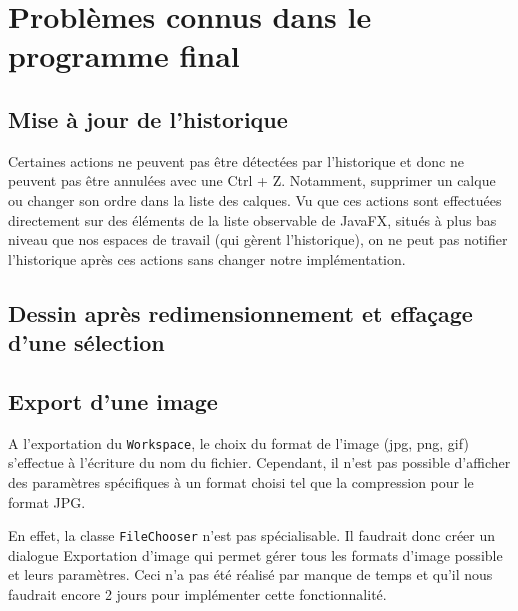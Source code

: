 \section{Problèmes connus dans le programme final}
\subsection{Mise à jour de l'historique}
Certaines actions ne peuvent pas être détectées par l'historique et donc ne peuvent pas être annulées avec une Ctrl + Z. Notamment, supprimer un calque ou changer son ordre dans la liste des calques. Vu que ces actions sont effectuées directement sur des éléments de la liste observable de JavaFX, situés à plus bas niveau que nos espaces de travail (qui gèrent l'historique), on ne peut pas notifier l'historique après ces actions sans changer notre implémentation.
\subsection{Dessin après redimensionnement et effaçage d'une sélection}

\subsection{Export d'une image}
A l'exportation du \texttt{Workspace}, le choix du format de l'image (jpg, png, gif) s'effectue à l'écriture du nom du fichier. Cependant, il n'est pas possible d'afficher des paramètres spécifiques à un format choisi tel que la compression pour le format JPG.

En effet, la classe \texttt{FileChooser} n'est pas spécialisable. Il faudrait donc créer un dialogue \og Exportation d'image \fg{} qui permet gérer tous les formats d'image possible et leurs paramètres. Ceci n'a pas été réalisé par manque de temps et qu'il nous faudrait encore 2 jours pour implémenter cette fonctionnalité. 